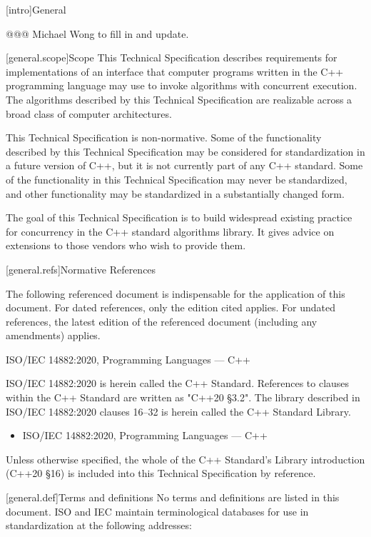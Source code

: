 
[intro]{General}

@@@ Michael Wong to fill in and update.

[general.scope]{Scope}
\pnum
This Technical Specification describes requirements for implementations of an interface that computer programs written in the C++ programming language may use to invoke algorithms with concurrent execution. The algorithms described by this Technical Specification are realizable across a broad class of computer architectures.

\pnum
This Technical Specification is non-normative. Some of the functionality described by this Technical Specification may be considered for standardization in a future version of C++, but it is not currently part of any C++ standard. Some of the functionality in this Technical Specification may never be standardized, and other functionality may be standardized in a substantially changed form.

\pnum
The goal of this Technical Specification is to build widespread existing practice for concurrency in the C++ standard algorithms library. It gives advice on extensions to those vendors who wish to provide them.

[general.refs]{Normative References}
\pnum

The following referenced document is indispensable for the application of this document. For dated references, only the edition cited applies. For undated references, the latest edition of the referenced document (including any amendments) applies.

ISO/IEC 14882:2020, Programming Languages — C++
\pnum

ISO/IEC 14882:2020 is herein called the C++ Standard. References to clauses within the C++ Standard are written as "C++20 §3.2". The library described in ISO/IEC 14882:2020 clauses 16–32 is herein called the C++ Standard Library.
\pnum

\begin{itemize}
\item {ISO/IEC 14882:2020, Programming Languages --- C++}
\end{itemize}

Unless otherwise specified, the whole of the C++ Standard's Library introduction (C++20 §16) is included into this Technical Specification by reference.


[general.def]{Terms and definitions}
\pnum
{}%
No terms and definitions are listed in this document. ISO and IEC maintain
terminological databases for use in standardization at the following addresses:

